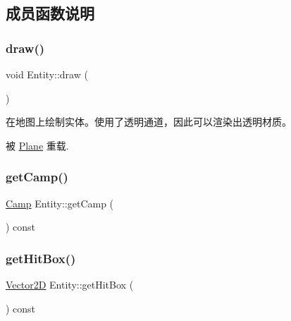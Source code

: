 \subsection{成员函数说明}
\mbox{\label{class_entity_a7666f416dd0d1fce0f1133f78df44476}} 
\subsubsection{\texorpdfstring{draw()}{draw()}}
{\footnotesize\ttfamily void Entity\+::draw (\begin{DoxyParamCaption}{ }\end{DoxyParamCaption})\hspace{0.3cm}{\ttfamily [virtual]}}



在地图上绘制实体。使用了透明通道，因此可以渲染出透明材质。 



被 \hyperlink{class_plane_a8877358878e91929c4c01bad40cbdb78}{Plane} 重载.

\mbox{\label{class_entity_a80b1c04df243bcdba1225a10e54995f1}} 
\subsubsection{\texorpdfstring{get\+Camp()}{getCamp()}}
{\footnotesize\ttfamily \hyperlink{_entity_8h_ad54c4fe39f1c51b786c24ae0b7763b44}{Camp} Entity\+::get\+Camp (\begin{DoxyParamCaption}{ }\end{DoxyParamCaption}) const\hspace{0.3cm}{\ttfamily [inline]}}

\mbox{\label{class_entity_a4d69956308b0a0396ddba314c0aa0972}} 
\subsubsection{\texorpdfstring{get\+Hit\+Box()}{getHitBox()}}
{\footnotesize\ttfamily \hyperlink{_vector2_d_8hpp_aa1f1145650f1dd9bddf7335ec6434d7c}{Vector2D} Entity\+::get\+Hit\+Box (\begin{DoxyParamCaption}{ }\end{DoxyParamCaption}) const\hspace{0.3cm}{\ttfamily [inline]}}

